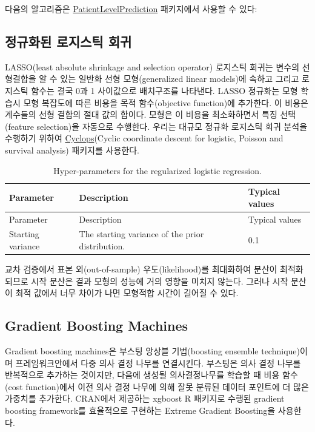 \documentclass[11pt]{book}
\theoremstyle{definition}
\theoremstyle{definition}
\theoremstyle{definition}
\theoremstyle{remark}
\begin{document}
다음의 알고리즘은
\href{https://ohdsi.github.io/PatientLevelPrediction/}{PatientLevelPrediction}
패키지에서 사용할 수 있다:

\subsection{정규화된 로지스틱 회귀}\label{--}

LASSO(least absolute shrinkage and selection operator) 로지스틱 회귀는
변수의 선형결합을 알 수 있는 일반화 선형 모형(generalized linear
models)에 속하고 그리고 로지스틱 함수는 결국 0과 1 사이값으로 배치구조를
나타낸다. LASSO 정규화는 모형 학습시 모형 복잡도에 따른 비용을 목적
함수(objective function)에 추가한다. 이 비용은 계수들의 선형 결합의 절대
값의 합이다. 모형은 이 비용을 최소화하면서 특징 선택(feature
selection)을 자동으로 수행한다. 우리는 대규모 정규화 로지스틱 회귀
분석을 수행하기 위하여
\href{https://ohdsi.github.io/Cyclops/}{Cyclops}(Cyclic coordinate
descent for logistic, Poisson and survival analysis) 패키지를 사용한다.
  

\begin{longtable}[]{@{}lll@{}}
\caption{\label{tab:lassoParameters} Hyper-parameters for the regularized
logistic regression.}\tabularnewline
\toprule
Parameter & Description & Typical values\tabularnewline
\midrule
\endfirsthead
\toprule
Parameter & Description & Typical values\tabularnewline
\midrule
\endhead
Starting variance & The starting variance of the prior distribution. &
0.1\tabularnewline
\bottomrule
\end{longtable}

교차 검증에서 표본 외(out-of-sample) 우도(likelihood)를 최대화하여
분산이 최적화되므로 시작 분산은 결과 모형의 성능에 거의 영향을 미치지
않는다. 그러나 시작 분산이 최적 값에서 너무 차이가 나면 모형적합 시간이
길어질 수 있다.  

\subsection{Gradient Boosting
Machines}\label{gradient-boosting-machines}

Gradient boosting machines은 부스팅 앙상블 기법(boosting ensemble
technique)이며 프레임워크안에서 다중 의사 결정 나무를 연결시킨다.
부스팅은 의사 결정 나무를 반복적으로 추가하는 것이지만, 다음에 생성될
의사결정나무를 학습할 때 비용 함수(cost function)에서 이전 의사 결정
나무에 의해 잘못 분류된 데이터 포인트에 더 많은 가중치를 추가한다.
CRAN에서 제공하는 xgboost R 패키지로 수행된 gradient boosting
framework를 효율적으로 구현하는 Extreme Gradient Boosting을 사용한다.
 
\end{document}
